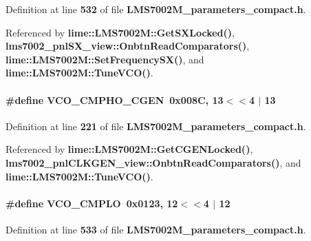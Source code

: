 Definition at line {\bf 532} of file {\bf L\+M\+S7002\+M\+\_\+parameters\+\_\+compact.\+h}.



Referenced by {\bf lime\+::\+L\+M\+S7002\+M\+::\+Get\+S\+X\+Locked()}, {\bf lms7002\+\_\+pnl\+S\+X\+\_\+view\+::\+Onbtn\+Read\+Comparators()}, {\bf lime\+::\+L\+M\+S7002\+M\+::\+Set\+Frequency\+S\+X()}, and {\bf lime\+::\+L\+M\+S7002\+M\+::\+Tune\+V\+C\+O()}.

\paragraph[{V\+C\+O\+\_\+\+C\+M\+P\+H\+O\+\_\+\+C\+G\+EN}]{\setlength{\rightskip}{0pt plus 5cm}\#define V\+C\+O\+\_\+\+C\+M\+P\+H\+O\+\_\+\+C\+G\+EN~0x008\+C, 13$<$$<$4 $\vert$  13}\label{LMS7002M__parameters__compact_8h_a6b63ab5d6ee437c2b51e661d592cbf5f}


Definition at line {\bf 221} of file {\bf L\+M\+S7002\+M\+\_\+parameters\+\_\+compact.\+h}.



Referenced by {\bf lime\+::\+L\+M\+S7002\+M\+::\+Get\+C\+G\+E\+N\+Locked()}, {\bf lms7002\+\_\+pnl\+C\+L\+K\+G\+E\+N\+\_\+view\+::\+Onbtn\+Read\+Comparators()}, and {\bf lime\+::\+L\+M\+S7002\+M\+::\+Tune\+V\+C\+O()}.

\paragraph[{V\+C\+O\+\_\+\+C\+M\+P\+LO}]{\setlength{\rightskip}{0pt plus 5cm}\#define V\+C\+O\+\_\+\+C\+M\+P\+LO~0x0123, 12$<$$<$4 $\vert$  12}\label{LMS7002M__parameters__compact_8h_ade3b304213f42fc7e02f50179979b4a5}


Definition at line {\bf 533} of file {\bf L\+M\+S7002\+M\+\_\+parameters\+\_\+compact.\+h}.



